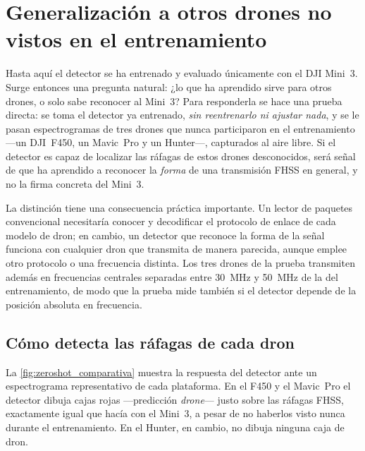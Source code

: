 \section{Generalización a otros drones no vistos en el entrenamiento}
\label{sec:zeroshot}

Hasta aquí el detector se ha entrenado y evaluado únicamente con el DJI Mini~3. Surge entonces una pregunta natural: ¿lo que ha aprendido sirve para otros drones, o solo sabe reconocer al Mini~3? Para responderla se hace una prueba directa: se toma el detector ya entrenado, \emph{sin reentrenarlo ni ajustar nada}, y se le pasan espectrogramas de tres drones que nunca participaron en el entrenamiento ---un DJI~F450, un Mavic~Pro y un Hunter---, capturados al aire libre. Si el detector es capaz de localizar las ráfagas de estos drones desconocidos, será señal de que ha aprendido a reconocer la \emph{forma} de una transmisión FHSS en general, y no la firma concreta del Mini~3.

La distinción tiene una consecuencia práctica importante. Un lector de paquetes convencional necesitaría conocer y decodificar el protocolo de enlace de cada modelo de dron; en cambio, un detector que reconoce la forma de la señal funciona con cualquier dron que transmita de manera parecida, aunque emplee otro protocolo o una frecuencia distinta. Los tres drones de la prueba transmiten además en frecuencias centrales separadas entre \SI{30}{\mega\hertz} y \SI{50}{\mega\hertz} de la del entrenamiento, de modo que la prueba mide también si el detector depende de la posición absoluta en frecuencia.

\subsection{Cómo detecta las ráfagas de cada dron}
\label{sec:zeroshot_ejemplos}

La \cref{fig:zeroshot_comparativa} muestra la respuesta del detector ante un espectrograma representativo de cada plataforma. En el F450 y el Mavic~Pro el detector dibuja cajas rojas ---predicción \emph{drone}--- justo sobre las ráfagas FHSS, exactamente igual que hacía con el Mini~3, a pesar de no haberlos visto nunca durante el entrenamiento. En el Hunter, en cambio, no dibuja ninguna caja de dron.

